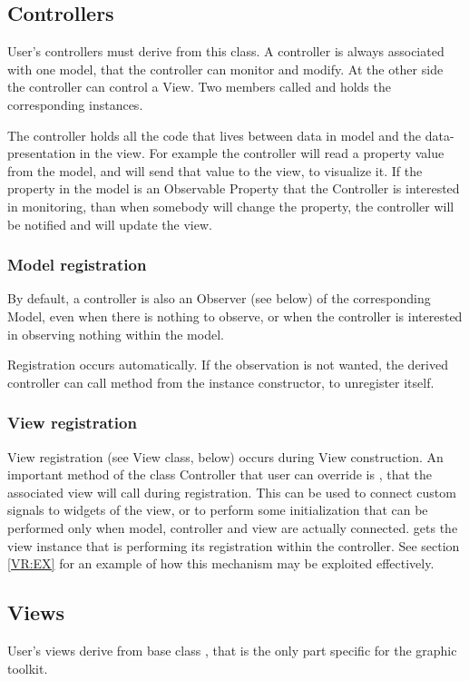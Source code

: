 \subsection{Controllers}
User's controllers must derive from this class.  A controller is
always associated with one model, that the controller can monitor and
modify. At the other side the controller can control a View.  Two
members called  and  holds the
corresponding instances.

The controller holds all the code that lives between data in model and
the data-presentation in the view. For example the controller will
read a property value from the model, and will send that value to the
view, to visualize it.  If the property in the model is an Observable
Property that the Controller is interested in monitoring, than when
somebody will change the property, the controller will be notified and
will update the view.


\subsubsection{Model registration}
By default, a controller is also an Observer (see below) of the
corresponding Model, even when there is nothing to observe, or when
the controller is interested in observing nothing within the model.

Registration occurs automatically. If the observation is not wanted,
the derived controller can call method 
from the instance constructor, to unregister itself.


\subsubsection{\label{VR:D}View registration}
View registration (see View class, below) occurs during View
construction. An important method of the class Controller that user
can override is , that the associated view
will call during registration. This can be used to connect custom
signals to widgets of the view, or to perform some initialization that
can be performed only when model, controller and view are actually
connected.   gets the view instance that is
performing its registration within the controller. See section
\ref{VR:EX} for an example of how this mechanism may be exploited
effectively. 

\subsection{Views}
User's views derive from base class , that is
the only part specific for the \pygtk graphic toolkit.

